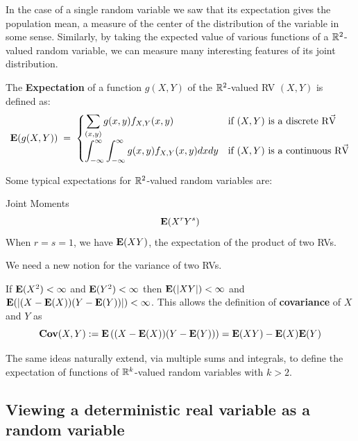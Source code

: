 In the case of a single random variable we saw that its expectation gives the population mean, 
a measure of the center of the distribution of the variable in some sense.  
Similarly, by taking the expected value of various functions of a $\mathbb{R}^2$-valued random variable, we can measure many interesting features of its joint distribution.

\begin{definition}\label{Df:2expectation}
The \textbf{Expectation} of a function $g(X,Y)$ of the $\mathbb{R}^2$-valued RV $(X,Y)$ is defined as:
\[
\mathbf{E}(g(X,Y))\; =\;
\begin{cases}
\displaystyle \sum_{(x,y)} g(x,y) f_{X,Y}(x,y) & \text{if $(X,Y)$ is a discrete {\mbox{R$\vec{\text V}$}}}\\[12pt]
\displaystyle \int_{-\infty}^{\infty} \int_{-\infty}^{\infty} g(x,y) f_{X,Y}(x,y) dx dy & \text{if $(X,Y)$ is a continuous {\mbox{R$\vec{\text V}$}}}
\end{cases}
\]
\end{definition}

Some typical expectations for $\mathbb{R}^2$-valued random variables are:

\be
\item Joint Moments
\[
\mathbf{E}(X^r Y^s)
\]
When $r=s=1$, we have $\mathbf{E}(XY)$, the expectation of the product of two RVs.
\item 
We need a new notion for the variance of two RVs.

If $\mathbf{E}(X^2) < \infty$ and $\mathbf{E}(Y^2) < \infty$ then $\mathbf{E}(|X Y|) < \infty$ and $\mathbf{E}(|(X-\mathbf{E}(X))(Y-\mathbf{E}(Y))|) < \infty$.  This allows the definition of {\bf covariance} of $X$ and $Y$ as
\[
\mathbf{Cov}(X,Y) := \mathbf{E} \left((X-\mathbf{E}(X))(Y-\mathbf{E}(Y))\right) = \mathbf{E}(X Y) - \mathbf{E}(X) \mathbf{E}(Y)
\]
\ee

The same ideas naturally extend, via multiple sums and integrals, to define the expectation of functions of $\mathbb{R}^k$-valued random variables with $k>2$.

\subsection*{Viewing a deterministic real variable as a random variable}

